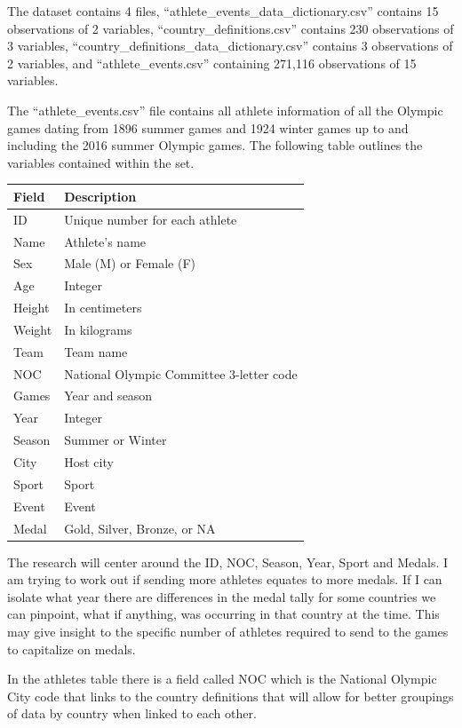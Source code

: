 \documentclass[
]{article}
\begin{document}
The dataset contains 4 files, ``athlete\_events\_data\_dictionary.csv'' contains 15 observations of 2 variables, ``country\_definitions.csv'' contains 230 observations of 3 variables, ``country\_definitions\_data\_dictionary.csv'' contains 3 observations of 2 variables, and ``athlete\_events.csv'' containing 271,116 observations of 15 variables.

The ``athlete\_events.csv'' file contains all athlete information of all the Olympic games dating from 1896 summer games and 1924 winter games up to and including the 2016 summer Olympic games. The following table outlines the variables contained within the set.

\begin{longtable}[t]{ll}
\toprule
Field & Description\\
\midrule
ID & Unique number for each athlete\\
Name & Athlete's name\\
Sex & Male (M) or Female (F)\\
Age & Integer\\
Height & In centimeters\\
\addlinespace
Weight & In kilograms\\
Team & Team name\\
NOC & National Olympic Committee 3-letter code\\
Games & Year and season\\
Year & Integer\\
\addlinespace
Season & Summer or Winter\\
City & Host city\\
Sport & Sport\\
Event & Event\\
Medal & Gold, Silver, Bronze, or NA\\
\bottomrule
\end{longtable}

The research will center around the ID, NOC, Season, Year, Sport and Medals. I am trying to work out if sending more athletes equates to more medals. If I can isolate what year there are differences in the medal tally for some countries we can pinpoint, what if anything, was occurring in that country at the time. This may give insight to the specific number of athletes required to send to the games to capitalize on medals.

In the athletes table there is a field called NOC which is the National Olympic City code that links to the country definitions that will allow for better groupings of data by country when linked to each other.
\end{document}
